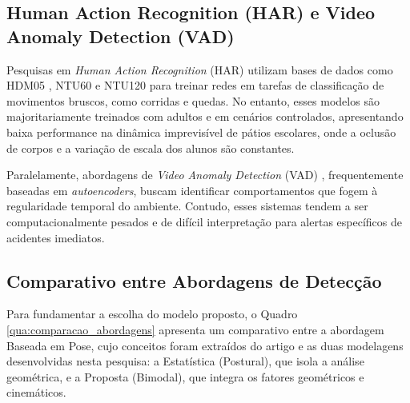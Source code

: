 \documentclass[12pt]{article}
\begin{document}
\subsection{Human Action Recognition (HAR) e Video Anomaly Detection (VAD)}

Pesquisas em \textit{Human Action Recognition} (HAR) \cite{Lu_2023_ICCV} utilizam bases de dados como 
HDM05 \cite{cg-2007-2}, NTU60 \cite{shahroudy2016ntu} e NTU120 \cite{Liu_2020} para treinar redes em 
tarefas de classificação de movimentos bruscos, como corridas e quedas. No entanto, esses modelos são
majoritariamente treinados com adultos e em cenários controlados, apresentando baixa performance na
dinâmica imprevisível de pátios escolares, onde a oclusão de corpos e a variação de escala dos alunos
são constantes.

Paralelamente, abordagens de \textit{Video Anomaly Detection} (VAD) \cite{Huang_2025_CVPR}, frequentemente
baseadas em \textit{autoencoders}, buscam identificar comportamentos que fogem à regularidade temporal do
ambiente. Contudo, esses sistemas tendem a ser computacionalmente pesados e de difícil interpretação para
alertas específicos de acidentes imediatos.

\subsection{Comparativo entre Abordagens de Detecção}

Para fundamentar a escolha do modelo proposto, o Quadro \ref{qua:comparacao_abordagens} apresenta um 
comparativo entre a abordagem Baseada em Pose, cujo conceitos foram extraídos do artigo \cite{delic2025}
e as duas modelagens desenvolvidas nesta pesquisa: a Estatística (Postural), que isola a análise geométrica,
e a Proposta (Bimodal), que integra os fatores geométricos e cinemáticos.
\end{document}
